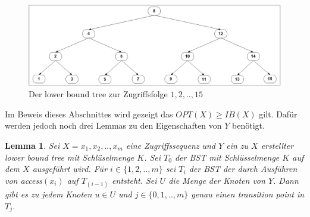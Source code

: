 \documentclass[a4paper,12pt]{article}
\begin{document}
 \begin{figure}[h]
 	\centering
 	\includegraphics[width=1\textwidth]{"Medien/Tango/lowerBoundTree"}
 	\caption{Der lower bound tree zur Zugriffsfolge $1 ,2, .., 15$  }
 	\label{fig:demlowerBoundTree}
 \end{figure}

\noindent Im Beweis dieses Abschnittes wird gezeigt das $\mathit{OPT}\left(X\right) \geq \mathit{IB}\left(X\right)$ gilt. Dafür werden jedoch noch drei Lemmas zu den Eigenschaften von $Y$ benötigt. 
\newtheorem{Lemma4}{Lemma}[section] 
\begin{Lemma4} \label{demaineLemma1}
Sei $X = x_1,x_2,..,x_m$ eine Zugriffssequenz und $Y$ ein zu $X$ erstellter lower bound tree mit Schlüselmenge $K$. Sei $T_0$ der BST mit Schlüsselmenge $K$ auf dem $X$ ausgeführt wird. Für $i \in \{1,2,..,m\}$ sei $T_i$ der BST der durch Ausführen von \textit{access}$\left(x_i\right)$ auf $T_{\left(i-1\right)}$ entsteht. Sei $U$ die Menge der Knoten von $Y$. Dann gibt es zu jedem Knoten $u \in U$ und $j \in \{0,1,..,m\}$ genau einen transition point in $T_j$. 	
\end{Lemma4}
\end{document}
